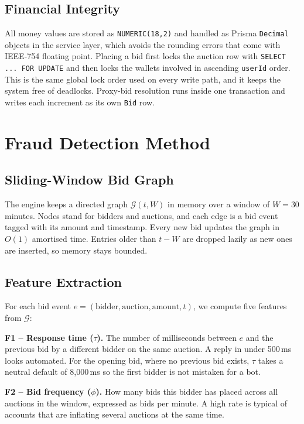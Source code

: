 \documentclass[conference]{IEEEtran}
\begin{document}
\subsection{Financial Integrity}

All money values are stored as {\tt NUMERIC(18,2)} and handled as Prisma
{\tt Decimal} objects in the service layer, which avoids the rounding
errors that come with IEEE-754 floating point. Placing a bid first locks
the auction row with {\tt SELECT ... FOR UPDATE} and then locks the
wallets involved in ascending {\tt userId} order. This is the same global
lock order used on every write path, and it keeps the system free of
deadlocks. Proxy-bid resolution runs inside one transaction and writes
each increment as its own {\tt Bid} row.

\section{Fraud Detection Method}
\label{sec:fraud}

\subsection{Sliding-Window Bid Graph}

The engine keeps a directed graph $\mathcal{G}(t, W)$ in memory over a
window of $W = 30$ minutes. Nodes stand for bidders and auctions, and
each edge is a bid event tagged with its amount and timestamp. Every new
bid updates the graph in $O(1)$ amortised time. Entries older than
$t - W$ are dropped lazily as new ones are inserted, so memory stays
bounded.

\subsection{Feature Extraction}

For each bid event $e = (\text{bidder}, \text{auction}, \text{amount},
t)$, we compute five features from $\mathcal{G}$:

\textbf{F1 -- Response time ($\tau$).} The number of milliseconds between
$e$ and the previous bid by a different bidder on the same auction. A
reply in under 500\,ms looks automated. For the opening bid, where no
previous bid exists, $\tau$ takes a neutral default of 8{,}000\,ms so the
first bidder is not mistaken for a bot.

\textbf{F2 -- Bid frequency ($\phi$).} How many bids this bidder has
placed across all auctions in the window, expressed as bids per minute. A
high rate is typical of accounts that are inflating several auctions at
the same time.
\end{document}
